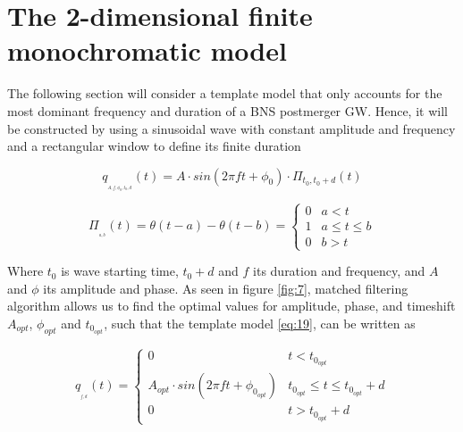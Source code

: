 \FloatBarrier


\section{The 2-dimensional finite monochromatic model}\label{2dsearch}

The following section will consider a template model that only accounts for the most dominant frequency and duration of a BNS postmerger GW. Hence, it will be constructed by using a sinusoidal wave with constant amplitude and frequency and a rectangular window to define its finite duration 


\begin{equation}\label{eq:19}
q_{_{_{A, f, \phi_0, t_{0}, d}}}(t) =A \cdot sin(2\pi f t + \phi_0) \cdot \Pi_{t_{0},t_{0} + d}(t)
\end{equation}


\begin{equation}\label{eq:18}
\Pi_{_{_{a,b}}}(t) = \theta(t-a)-\theta(t-b) = 
\begin{cases} 
      0 & a<t \\
      1 & a \leq t\leq b \\
      0 & b>t
   \end{cases}
\end{equation}

Where $t_0$ is wave starting time, $t_0+d$ and $f$ its duration and frequency, and $A$ and $\phi$ its amplitude and phase. As seen in figure \ref{fig:7}, matched filtering algorithm allows us to find the optimal values for amplitude, phase, and timeshift $A_{opt}$, $\phi_{opt}$ and $t_{0_{opt}}$, such that the template model \ref{eq:19}, can be written as

\begin{equation}\label{eq:20}
q_{_{_{f,d}}}(t) =
\begin{cases} 
      0 & t<t_{0_{opt}} \\
      A_{opt} \cdot sin(2\pi f t + \phi_{0_{opt}}) & t_{0_{opt}} \leq t\leq t_{0_{opt}}+d \\
      0 & t>t_{0_{opt}}+d
   \end{cases}
\end{equation}

